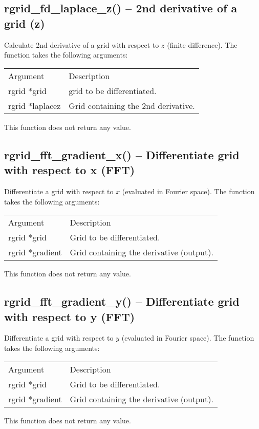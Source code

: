 \documentclass[12pt,letterpaper]{report}
\begin{document}
\subsection{rgrid\_fd\_laplace\_z() -- 2nd derivative of a grid (z)}

Calculate 2nd derivative of a grid with respect to $z$ (finite difference). The function takes the following arguments:
\begin{longtable}{p{} p{}}
Argument & Description\\
\cline{1-2}
rgrid *grid & grid to be differentiated.\\
rgrid *laplacez & Grid containing the 2nd derivative.\\
\end{longtable}
\noindent
This function does not return any value.

\subsection{rgrid\_fft\_gradient\_x() -- Differentiate grid with respect to x (FFT)}

Differentiate a grid with respect to $x$ (evaluated in Fourier space). The function takes the following arguments:
\begin{longtable}{p{} p{}}
Argument & Description\\
\cline{1-2}
rgrid *grid & Grid to be differentiated.\\
rgrid *gradient & Grid containing the derivative (output).\\
\end{longtable}
\noindent
This function does not return any value.

\subsection{rgrid\_fft\_gradient\_y() -- Differentiate grid with respect to y (FFT)}

Differentiate a grid with respect to $y$ (evaluated in Fourier space). The function takes the following arguments:
\begin{longtable}{p{} p{}}
Argument & Description\\
\cline{1-2}
rgrid *grid & Grid to be differentiated.\\
rgrid *gradient & Grid containing the derivative (output).\\
\end{longtable}
\noindent
This function does not return any value.
\end{document}
